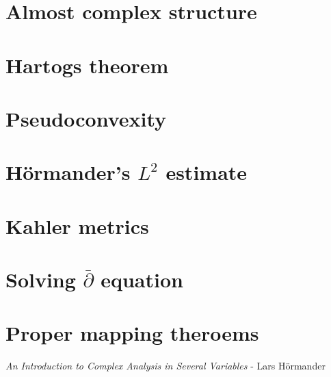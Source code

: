 \documentclass[a4paper,10pt]{article}
\begin{document}
\section{Almost complex structure}

\newpage

\section{Hartogs theorem}

\newpage

\section{Pseudoconvexity}

\newpage

\section{H\"ormander's $L^2$ estimate}

\newpage

\section{Kahler metrics}

\newpage

\section{Solving $\bar\partial$ equation}

\newpage

\section{Proper mapping theroems}

\newpage

\begin{thebibliography}{}

\textit{An Introduction to Complex Analysis in Several Variables} - Lars H\"ormander



\end{thebibliography}

\printindex
\newpage
\end{document}
